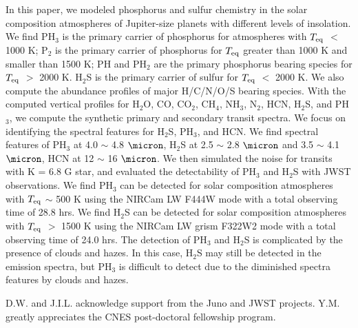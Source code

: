 \documentclass[twocolumn]{aastex61}
\begin{document}
In this paper, we modeled phosphorus and sulfur chemistry in the solar composition atmospheres of Jupiter-size planets with different levels of insolation. 
We find PH$_3$ is the primary carrier of phosphorus for atmospheres with $T_{\rm eq}$ $<$ 1000 K; P$_2$ is the primary carrier of phosphorus for $T_{\rm eq}$ greater than 1000 K and smaller than 1500 K; PH and PH$_2$ are the primary phosphorus bearing species for $T_{\rm eq}$ $>$ 2000 K. H$_2$S is the primary carrier of sulfur for $T_{\rm eq}$ $<$ 2000 K. We also compute the abundance profiles of major H/C/N/O/S bearing species. With the computed vertical profiles for H$_2$O, CO, CO$_2$, CH$_4$, NH$_3$, N$_2$, HCN, H$_2$S, and PH$_3$, we compute the synthetic primary and secondary transit spectra. 
We focus on identifying the spectral features for H$_2$S, PH$_3$, and HCN. We find spectral features of PH$_3$ at 4.0 $\sim$ 4.8 $\micron$,  H$_2$S at 2.5 $\sim$ 2.8 $\micron$ and 3.5 $\sim$ 4.1 $\micron$, HCN at 12 $\sim$ 16 $\micron$. We then simulated the noise for transits with K = 6.8 G star, and evaluated the detectability of PH$_3$ and H$_2$S with JWST observations. We find PH$_3$ can be detected for solar composition atmospheres with $T_{\rm eq}$ $\sim$ 500 K using the NIRCam LW F444W mode with a total observing time of 28.8 hrs. We find H$_2$S can be detected for solar composition atmospheres with $T_{\rm eq}$ $>$ 1500 K using the NIRCam LW grism F322W2 mode with a total observing time of 24.0 hrs. The detection of PH$_3$ and H$_2$S is complicated by the presence of clouds and hazes. In this case, H$_2$S may still be detected in the emission spectra, but PH$_3$ is difficult to detect due to the diminished spectra features by clouds and hazes.  

\acknowledgments

D.W. and J.I.L. acknowledge support from the Juno and JWST projects. Y.M. greatly appreciates the CNES post-doctoral fellowship program.

%


\end{document}
